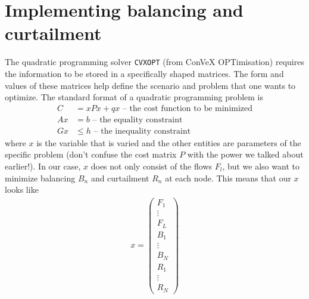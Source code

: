 \documentclass[english,twoside,a4paper,11pt]{article}
\numberwithin{equation}{section}
\begin{document}
\section{Implementing balancing and curtailment}
\label{sec:3}

The quadratic programming solver \texttt{CVXOPT} (from ConVeX
OPTimisation) requires the information to be stored in a specifically
shaped matrices. The form and values of these matrices help define the
scenario and problem that one wants to optimize. The standard format of
a quadratic programming problem is
\begin{align}
C&=x P x+q x \text{ -- the cost function to be minimized}
\label{eq:cost} \\
A x&=b \text{ -- the equality constraint}
\label{eq:eq}\\
G x &\leq h \text{ -- the inequality constraint}
\label{eq:ieq}
\end{align}
where $x$ is the variable that is varied and the other entities are
parameters of the specific problem (don't confuse the cost matrix $P$
with the power we talked about earlier!). In our case,
$x$ does not only consist of the flows $F_l$, but we also want to
minimize balancing $B_n$ and curtailment $R_n$ at each node. This
means that our $x$ looks like
\begin{align*}
x=\left(\begin{matrix}
F_1\\
\vdots\\
F_L\\
B_1\\
\vdots\\
B_N\\
R_1\\
\vdots\\
R_N
\end{matrix}
\right)
\end{align*}
\end{document}

